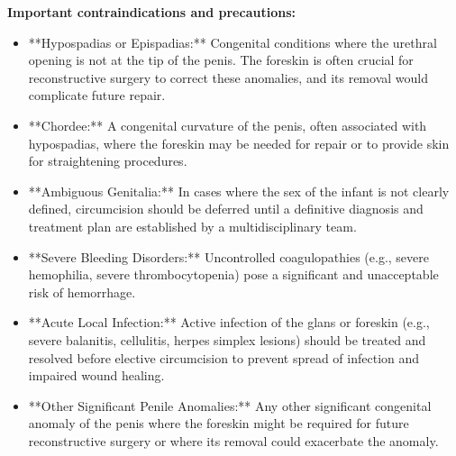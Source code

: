 \textbf{Important contraindications and precautions:}
\begin{itemize}
  \item **Hypospadias or Epispadias:** Congenital conditions where the urethral opening is not at the tip of the penis. The foreskin is often crucial for reconstructive surgery to correct these anomalies, and its removal would complicate future repair.
  \item **Chordee:** A congenital curvature of the penis, often associated with hypospadias, where the foreskin may be needed for repair or to provide skin for straightening procedures.
  \item **Ambiguous Genitalia:** In cases where the sex of the infant is not clearly defined, circumcision should be deferred until a definitive diagnosis and treatment plan are established by a multidisciplinary team.
  \item **Severe Bleeding Disorders:** Uncontrolled coagulopathies (e.g., severe hemophilia, severe thrombocytopenia) pose a significant and unacceptable risk of hemorrhage.
  \item **Acute Local Infection:** Active infection of the glans or foreskin (e.g., severe balanitis, cellulitis, herpes simplex lesions) should be treated and resolved before elective circumcision to prevent spread of infection and impaired wound healing.
  \item **Other Significant Penile Anomalies:** Any other significant congenital anomaly of the penis where the foreskin might be required for future reconstructive surgery or where its removal could exacerbate the anomaly.
\end{itemize}

